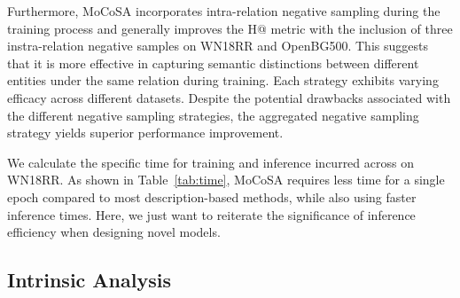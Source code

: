 \documentclass[11pt]{article}
\begin{document}
Furthermore, MoCoSA incorporates intra-relation negative sampling during the training process and generally improves the H@ metric with the inclusion of three instra-relation negative samples on WN18RR and OpenBG500. This suggests that it is more effective in capturing semantic distinctions between different entities under the same relation during training. Each strategy exhibits varying efficacy across different datasets. Despite the potential drawbacks associated with the different negative sampling strategies, the aggregated negative sampling strategy yields superior performance improvement.
\begin{table}[!htbp]
	\centering
        \caption{
        Efficiency comparisons between MoCoSA and other PLM-based methods on WN18RR. Here, T/Ep and Inf indicate the training time per epoch and the inference time.
        }
        \vspace{-10pt}
        \label{tab:time} 
\end{table}
We calculate the specific time for training and inference incurred across on WN18RR. As shown in Table~\ref{tab:time}, MoCoSA requires less time for a single epoch compared to most description-based methods, while also using faster inference times. Here, we just want to reiterate the significance of inference efficiency when designing novel models.

\subsection{Intrinsic Analysis}
\end{document}

